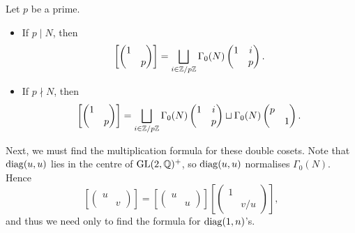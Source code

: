 \begin{example}
    Let $p$ be a prime.\begin{itemize}
\item If $p\mid N$,
then \[\left[ \begin{pmatrix}
    1 & \\ & p
\end{pmatrix} \right]
= \bigsqcup_{i\in\mathbb{Z}/p\mathbb{Z}} \Gamma_0(N)\begin{pmatrix}
    1 & i \\ & p
\end{pmatrix}.\]
\item If $p\nmid N$,
then \[\left[ \begin{pmatrix}
    1 & \\ & p
\end{pmatrix} \right]
= \bigsqcup_{i\in\mathbb{Z}/p\mathbb{Z}} \Gamma_0(N)\begin{pmatrix}
    1 & i \\ & p
\end{pmatrix}\sqcup \Gamma_0(N)\begin{pmatrix}
    p & \\ &1
\end{pmatrix}.\]

    \end{itemize}
\end{example}


Next, we must find the multiplication formula for these double cosets.
Note that $\operatorname{diag}(u, u)$ lies in the centre of $\operatorname{GL}(2, \mathbb{Q})^+$, so $\operatorname{diag}(u, u)$ normalises $\Gamma_0(N)$. Hence \[\left[ \begin{pmatrix}
    u &\\ & v
\end{pmatrix} \right] = \left[ \begin{pmatrix}
    u & \\ & u
\end{pmatrix}\right]\left[\begin{pmatrix}
    1 & \\ & v/u
\end{pmatrix} \right],\]
and thus we need only to find the formula for $\operatorname{diag}(1, n)$'s.

